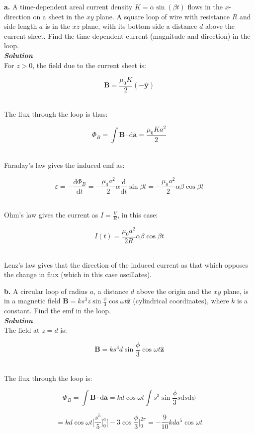 \documentclass[9pt]{extarticle}
\renewcommand{\v}[1]{{\bm #1}}
\newcommand{\hv}[1]{\hat{\bm{#1}}}
\newcommand{\bfit}[1]{\textbf{\textit{#1}}}
\renewcommand{\d}{\text{d}}
\newcommand{\ddt}[1]{\frac{\d #1}{\d t}}
\newcommand{\muo}{\mu_0}
\begin{document}
\begin{multicols*}{2}
{\Large \bf a.} A time-dependent areal current density  $K = \alpha\sin(\beta t)$ flows in the  $x$-direction on a sheet in the $xy$ plane. A square loop of wire with resistance $R$ and side length $a$ is in the $xz$ plane, with its bottom side a distance $d$ above the current sheet. Find the time-dependent current (magnitude and direction) in the loop. \\ 

{\bfit{Solution}} \\ 

For $z>0$, the field due to the current sheet is:

$$\v B = \frac{\muo K}{2} (-\hv y)$$ \ 

The flux through the loop is thus:

$$\Phi_B = \int \v B \cdot \d \v a = \frac{\muo Ka^2}{2}$$ \ 

Faraday's law gives the induced emf as:

$$\varepsilon = -\ddt{\Phi_B} = -\frac{\muo a^2}{2} \alpha \ddt{} \sin \beta t = -\frac{\muo a^2}{2} \alpha\beta\cos \beta t$$ \ 

Ohm's law gives the current as $I = \frac VR$, in this case:

$$I(t) = \frac{\muo a^2}{2R} \alpha \beta \cos \beta t$$ \ 

Lenz's law gives that the direction of the induced current as that which opposes the change in flux (which in this case oscillates). \\ 



\dotfill 

\hfill 

{\Large \bf b.} A circular loop of radius $a$, a distance $d$ above the origin and the $xy$ plane, is in a magnetic field $\v B = ks^3 z \sin \frac \phi 3 \cos\omega t \hv z$ (cylindrical coordinates), where $k$ is  a constant. Find the  emf in  the loop. \\ 

{\bfit{Solution}} \\ 

The field at $z=d$ is:

$$\v B = ks^3 d \sin \frac \phi 3 \cos \omega t \hv z$$ \ 

The flux through the loop is:

$$\Phi_B = \int \v B \cdot \d \v a = kd \cos \omega t \int s^3 \sin \frac \phi 3 s \d s \d\phi$$

$$= kd\cos\omega t \bigg[ \frac{s^5}{5} \bigg]^a_0 \bigg[-3\cos\frac \phi 3 \bigg]_0^{2\pi} = -\frac{9}{10} kda^5 \cos\omega t$$ \ 


\end{multicols*}
\end{document}
